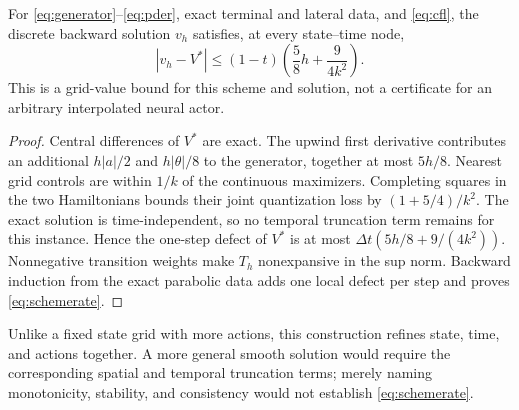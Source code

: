 \begin{proposition}\label{prop:scheme}
For \eqref{eq:generator}--\eqref{eq:pder}, exact terminal and lateral data, and \eqref{eq:cfl}, the discrete backward solution $v_h$ satisfies, at every state--time node,
\begin{equation}\label{eq:schemerate}
 |v_h-V^*|\leq (1-t)\left(\frac58h+\frac9{4k^2}\right).
\end{equation}
This is a grid-value bound for this scheme and solution, not a certificate for an arbitrary interpolated neural actor.
\end{proposition}
\begin{proof}
Central differences of $V^*$ are exact. The upwind first derivative contributes an additional $h|a|/2$ and $h|\theta|/8$ to the generator, together at most $5h/8$. Nearest grid controls are within $1/k$ of the continuous maximizers. Completing squares in the two Hamiltonians bounds their joint quantization loss by $(1+5/4)/k^2$. The exact solution is time-independent, so no temporal truncation term remains for this instance. Hence the one-step defect of $V^*$ is at most $\Delta t(5h/8+9/(4k^2))$. Nonnegative transition weights make $T_h$ nonexpansive in the sup norm. Backward induction from the exact parabolic data adds one local defect per step and proves \eqref{eq:schemerate}.\end{proof}

Unlike a fixed state grid with more actions, this construction refines state, time, and actions together. A more general smooth solution would require the corresponding spatial and temporal truncation terms; merely naming monotonicity, stability, and consistency would not establish \eqref{eq:schemerate}.

